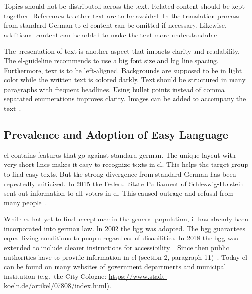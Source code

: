 Topics should not be distributed across the text.
Related content should be kept together.
References to other text are to be avoided.
In the translation process from standard German to \gls{el} content can be omitted if necessary.
Likewise, additional content can be added to make the text more understandable.

The presentation of text is another aspect that impacts clarity and readability.
The \gls{el}-guideline recommends to use a big font size and big line spacing.
Furthermore, text is to be left-aligned.
Backgrounds are supposed to be in light color while the written text is colored darkly.
Text should be structured in many paragraphs with frequent headlines.
Using bullet points instead of comma separated enumerations improves clarity.
Images can be added to accompany the text~\autocite{netzwerkLS}.

\subsection{Prevalence and Adoption of Easy Language}\label{subsec:el-adop}

\gls{el} contains features that go against standard german.
The unique layout with very short lines makes it easy to recognize texts in \gls{el}.
This helps the target group to find easy texts.
But the strong divergence from standard German has been repeatedly criticised.
In 2015 the Federal State Parliament of Schleswig-Holstein sent out information to all voters in \gls{el}.
This caused outrage and refusal from many people~\autocite{easyLanguageBook}.

While \gls{es} hat yet to find acceptance in the general population, it has already been incorporated into german law.
In 2002 the \gls{bgg} was adopted.
The \gls{bgg} guarantees equal living conditions to people regardless of disabilities.
In 2018 the \gls{bgg} was extended to include clearer instructions for accessibility~\autocite{bggInfo}.
Since then public authorities have to provide information in \gls{el} (section 2, paragraph 11)~\autocite{bgg2018}.
Today \gls{el} can be found on many websites of government departments and municipal institution (e.g.\ the City Cologne: \url{https://www.stadt-koeln.de/artikel/07808/index.html}).









